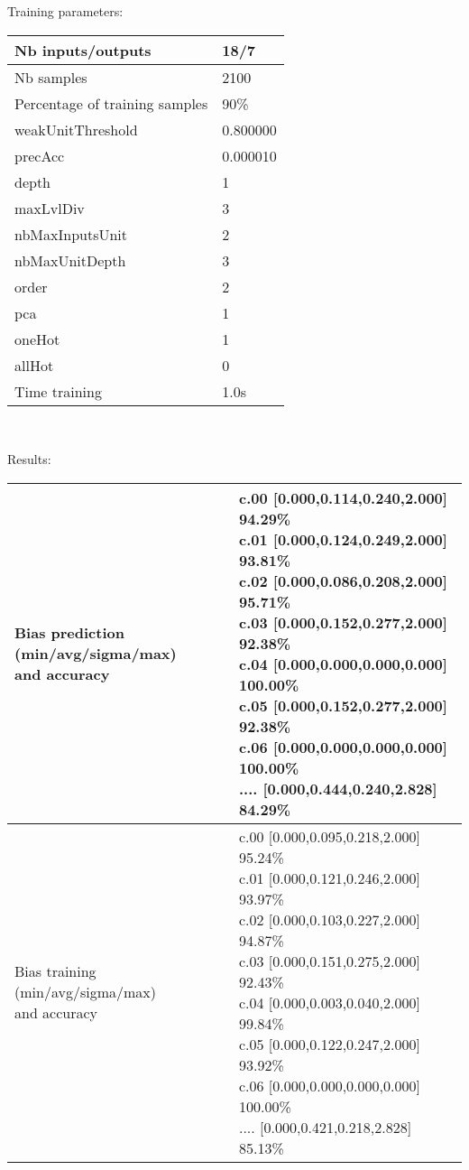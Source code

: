 Training parameters:\\
\begin{center}
\begin{tabular}{|l|l|}
\hline
Nb inputs/outputs&18/7\\
\hline
Nb samples&2100\\
\hline
Percentage of training samples&90\%\\
\hline
weakUnitThreshold&0.800000\\
\hline
precAcc&0.000010\\
\hline
depth&1\\
\hline
maxLvlDiv&3\\
\hline
nbMaxInputsUnit&2\\
\hline
nbMaxUnitDepth&3\\
\hline
order&2\\
\hline
pca&1\\
\hline
oneHot&1\\
\hline
allHot&0\\
\hline
Time training&1.0s\\
\hline
\end{tabular}\\
\end{center}\newline
Results:
\begin{center}
\begin{tabular}{|l|l|}
\hline
\makecell{Bias prediction (min/avg/sigma/max)\\and accuracy}&\makecell{c.00 [0.000,0.114,0.240,2.000] 94.29\%\\
c.01 [0.000,0.124,0.249,2.000] 93.81\%\\
c.02 [0.000,0.086,0.208,2.000] 95.71\%\\
c.03 [0.000,0.152,0.277,2.000] 92.38\%\\
c.04 [0.000,0.000,0.000,0.000] 100.00\%\\
c.05 [0.000,0.152,0.277,2.000] 92.38\%\\
c.06 [0.000,0.000,0.000,0.000] 100.00\%\\
.... [0.000,0.444,0.240,2.828] 84.29\%\\
}\\

\hline
\makecell{Bias training (min/avg/sigma/max)\\and accuracy}&\makecell{c.00 [0.000,0.095,0.218,2.000] 95.24\%\\
c.01 [0.000,0.121,0.246,2.000] 93.97\%\\
c.02 [0.000,0.103,0.227,2.000] 94.87\%\\
c.03 [0.000,0.151,0.275,2.000] 92.43\%\\
c.04 [0.000,0.003,0.040,2.000] 99.84\%\\
c.05 [0.000,0.122,0.247,2.000] 93.92\%\\
c.06 [0.000,0.000,0.000,0.000] 100.00\%\\
.... [0.000,0.421,0.218,2.828] 85.13\%\\
}\\
\hline
\end{tabular}\
\end{center}
